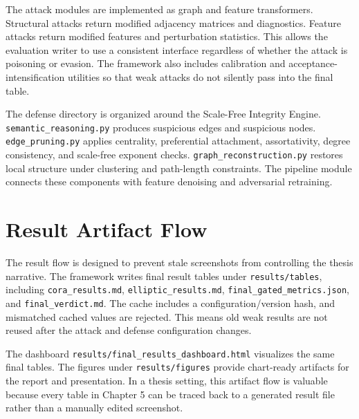 \documentclass[12pt,oneside]{report}
\begin{document}
The attack modules are implemented as graph and feature transformers. Structural attacks return modified adjacency matrices and diagnostics. Feature attacks return modified features and perturbation statistics. This allows the evaluation writer to use a consistent interface regardless of whether the attack is poisoning or evasion. The framework also includes calibration and acceptance-intensification utilities so that weak attacks do not silently pass into the final table.

The defense directory is organized around the Scale-Free Integrity Engine. \texttt{semantic\_reasoning.py} produces suspicious edges and suspicious nodes. \texttt{edge\_pruning.py} applies centrality, preferential attachment, assortativity, degree consistency, and scale-free exponent checks. \texttt{graph\_reconstruction.py} restores local structure under clustering and path-length constraints. The pipeline module connects these components with feature denoising and adversarial retraining.

\section{Result Artifact Flow}
The result flow is designed to prevent stale screenshots from controlling the thesis narrative. The framework writes final result tables under \texttt{results/tables}, including \texttt{cora\_results.md}, \texttt{elliptic\_results.md}, \texttt{final\_gated\_metrics.json}, and \texttt{final\_verdict.md}. The cache includes a configuration/version hash, and mismatched cached values are rejected. This means old weak results are not reused after the attack and defense configuration changes.

The dashboard \texttt{results/final\_results\_dashboard.html} visualizes the same final tables. The figures under \texttt{results/figures} provide chart-ready artifacts for the report and presentation. In a thesis setting, this artifact flow is valuable because every table in Chapter 5 can be traced back to a generated result file rather than a manually edited screenshot.
\end{document}
